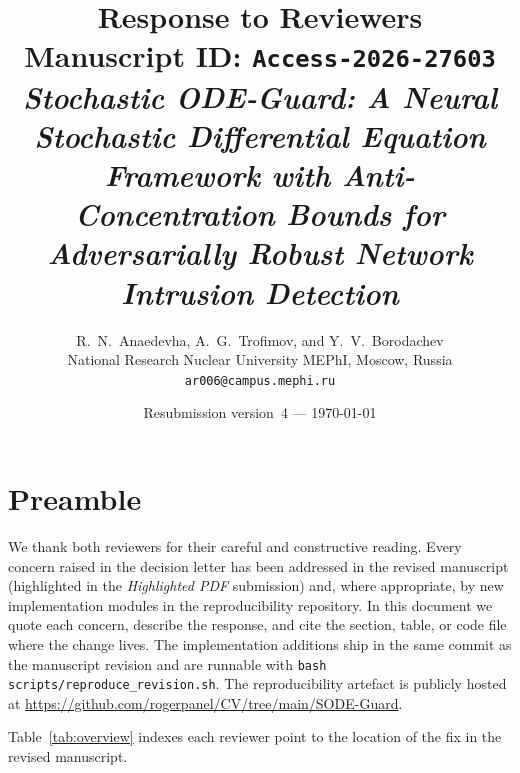 \documentclass[11pt,letterpaper]{article}
\title{\vspace{-1.4cm}
       \textbf{Response to Reviewers}\\[4pt]
       \normalsize Manuscript ID: \texttt{Access-2026-27603}\\
       \normalsize \emph{Stochastic ODE-Guard: A Neural Stochastic
       Differential Equation Framework with Anti-Concentration Bounds for
       Adversarially Robust Network Intrusion Detection}}
\author{R.\ N.\ Anaedevha, A.\ G.\ Trofimov, and Y.\ V.\ Borodachev\\
        \normalsize National Research Nuclear University MEPhI, Moscow, Russia\\
        \normalsize \texttt{ar006@campus.mephi.ru}}
\date{\normalsize Resubmission version~4 --- \today}
\begin{document}
\maketitle
\thispagestyle{fancy}
\vspace{-0.6cm}

\section*{Preamble}
We thank both reviewers for their careful and constructive reading. Every
concern raised in the decision letter has been addressed in the revised
manuscript (highlighted in the \emph{Highlighted PDF} submission) and,
where appropriate, by new implementation modules in the reproducibility
repository. In this document we quote each concern, describe the
response, and cite the section, table, or code file where the change
lives. The implementation additions ship in the same commit as the
manuscript revision and are runnable with
\texttt{bash scripts/reproduce\_revision.sh}. The reproducibility
artefact is publicly hosted at
\url{https://github.com/rogerpanel/CV/tree/main/SODE-Guard}.

Table~\ref{tab:overview} indexes each reviewer point to the location
of the fix in the revised manuscript.
\end{document}
